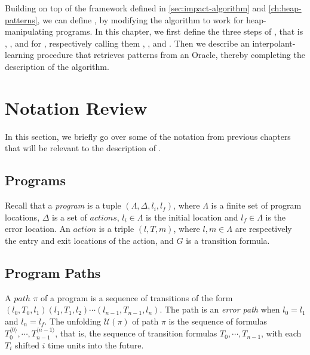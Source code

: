 
\label{ch:heap-impact-algorithm}
%

Building on top of the framework defined in \autoref{sec:impact-algorithm} and \autoref{ch:heap-patterns}, we can define \verifier, by modifying the \impact algorithm to work for heap-manipulating programs. In this chapter, we first define the three steps of \impact, that is \expand, \cover, and  for \verifier, respectively calling them \expandp, \coverp, and . Then we describe an interpolant-learning procedure that retrieves patterns from an Oracle, thereby completing the description of the algorithm.

\section{Notation Review}
In this section, we briefly go over some of the notation from previous chapters that will be relevant to the description of \verifier.

\subsection{Programs}
Recall that a \textit{program} is a tuple $(\Lambda, \Delta, l_i, l_f)$, where $\Lambda$ is a finite set of program locations, $\Delta$ is a set of $actions$, $l_i \in \Lambda$ is the initial location and $l_f \in \Lambda$ is the error location. An $action$ is a triple $(l, T, m)$, where $l,m \in \Lambda$ are respectively the entry and exit locations of the action, and $G$ is a transition formula.

\subsection{Program Paths}
A $path$ $\pi$ of a program is a sequence of transitions of the form $(l_0, T_0, l_1)(l_1, T_1, l_2) \cdots (l_{n-1}, T_{n-1}, l_n)$. The path is an \textit{error path} when $l_0 = l_1$ and $l_n = l_f$. The unfolding $\mathcal{U}(\pi)$ of path $\pi$ is the sequence of formulas $T_0^{\langle 0 \rangle}, \cdots, T_{n-1}^{\langle n-1 \rangle}$, that is, the sequence of transition formulas $T_0, \cdots, T_{n-1}$, with each $T_i$ shifted $i$ time units into the future.

